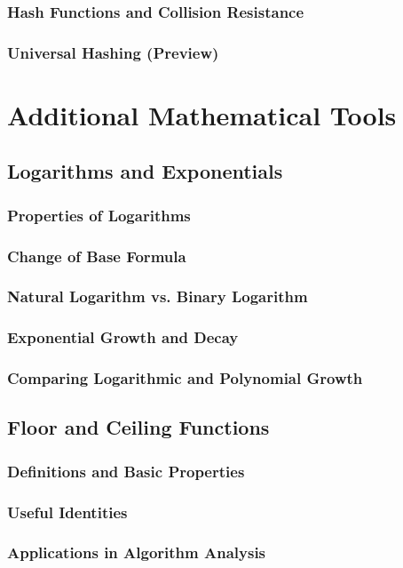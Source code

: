 \subsubsection{Hash Functions and Collision Resistance}
\subsubsection{Universal Hashing (Preview)}

\section{Additional Mathematical Tools}
\subsection{Logarithms and Exponentials}
\subsubsection{Properties of Logarithms}
\subsubsection{Change of Base Formula}
\subsubsection{Natural Logarithm vs. Binary Logarithm}
\subsubsection{Exponential Growth and Decay}
\subsubsection{Comparing Logarithmic and Polynomial Growth}

\subsection{Floor and Ceiling Functions}
\subsubsection{Definitions and Basic Properties}
\subsubsection{Useful Identities}
\subsubsection{Applications in Algorithm Analysis}

